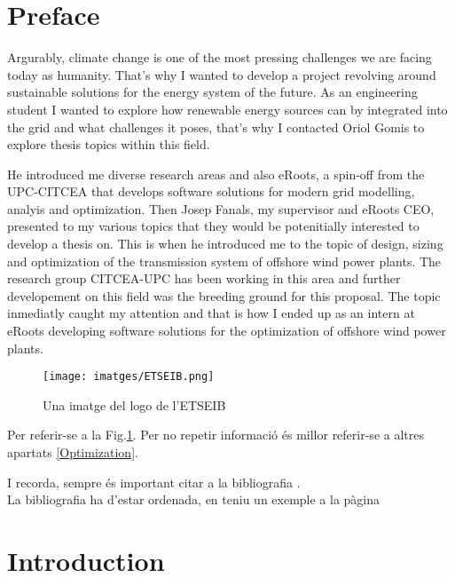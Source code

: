 \documentclass[a4paper,11pt, titlepage, twoside]{article}
\begin{document}
\printnomenclature
\listoffigures
\listoftables




\section{Preface}

Argurably, climate change is one of the most pressing challenges we are facing today as humanity.
That's why I wanted to develop a project revolving around sustainable solutions for the 
energy system of the future. As an engineering student I wanted to explore how renewable 
energy sources can by integrated into the grid and what challenges it poses, that's why I 
contacted Oriol Gomis to explore thesis topics within this field.\par

He introduced me diverse research areas and also eRoots, a spin-off from the UPC-CITCEA
that develops software solutions for modern grid modelling, analyis and optimization. Then Josep Fanals, my supervisor
and eRoots CEO, presented to my various topics that they would be potenitially interested to develop a thesis on. This is when 
he introduced me to the topic of design, sizing and optimization of the transmission system of offshore wind power plants. The research 
group CITCEA-UPC has been working in this area \cite{paperbase} and further developement on this field was the breeding ground for this proposal.
The topic inmediatly caught my attention and that is how I ended up as an intern at eRoots developing software solutions for the optimization of offshore wind power plants.


\begin{figure}[H] %
	\centering
	\texttt{[image: imatges/ETSEIB.png]}
	\caption{Una imatge del logo de l'ETSEIB}
	\label{fig:ETSEIB} %
\end{figure}

Per referir-se a la Fig.\ref{fig:ETSEIB}.
Per no repetir informació és millor referir-se a altres apartats \ref{Optimization}.\par
I recorda, sempre és important citar a la bibliografia \cite{paperbase}.\\
La bibliografia ha d'estar ordenada, en teniu un exemple a la pàgina \pageref{biblio}
\section{Introduction}\label{Introduction}
\end{document}

